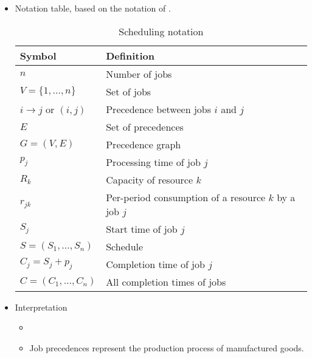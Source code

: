 \begin{itemize}
    \item {} Notation table, based on the notation of \cite{BRUCKER1999}.
    \begin{table}
        \centering
        \begin{tabular}{ll}
            Symbol & Definition \\
            \hline
            $n$                             & Number of jobs \\
            $V = \{ 1, \dots, n \}$         & Set of jobs \\
            $i \rightarrow j$ or $(i,j)$    & Precedence between jobs $i$ and $j$ \\
            $E$                             & Set of precedences \\
            $G = (V, E)$                    & Precedence graph \\
            \hline
            $p_j$       & Processing time of job $j$ \\
            $R_k$       & Capacity of resource $k$ \\
            $r_{jk}$    & Per-period consumption of a resource $k$ by a job $j$ \\
            \hline
            $S_j$                   & Start time of job $j$ \\
            $S = (S_1, \dots, S_n)$ & Schedule \\
            $C_j = S_j + p_j$       & Completion time of job $j$ \\
            $C = (C_1, \dots, C_n)$ & All completion times of jobs \\
        \end{tabular}
        
        \caption{Scheduling notation}
        \label{tab:SchedulingNotation}
    \end{table}

    \item Interpretation
    \begin{itemize}
        \item {}
        \item Job precedences represent the production process of manufactured goods.

    
    \end{itemize}
\end{itemize}

